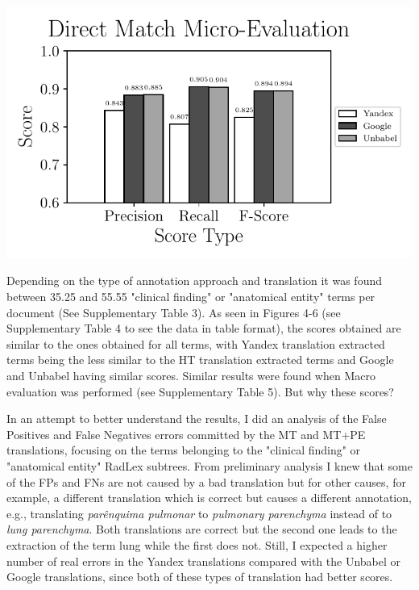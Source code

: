 \includegraphics{SupportFiles/plots/direct_match_micro_clinical_anatomical_subtrees_plot.pdf}

Depending on the type of annotation approach and translation it was found between 35.25 and 55.55 "clinical finding" or "anatomical entity" terms per document (See Supplementary Table 3). As seen in Figures 4-6 (see Supplementary Table 4 to see the data in table format), the scores obtained are similar to the ones obtained for all terms, with Yandex translation extracted terms being the less similar to the HT translation extracted terms and Google and Unbabel having similar scores. Similar results were found when Macro evaluation was performed (see Supplementary Table 5). But why these scores? 

In an attempt to better understand the results, I did an analysis of the False Positives and False Negatives errors committed by the MT and MT+PE translations, focusing on the terms belonging to the "clinical finding" or "anatomical entity" RadLex subtrees. From preliminary analysis I knew that some of the FPs and FNs are not caused by a bad translation but for other causes, for example, a different translation which is correct but causes a different annotation, e.g., translating \textit{parênquima pulmonar} to \textit{pulmonary parenchyma} instead of to \textit{lung parenchyma}. Both translations are correct but the second one leads to the extraction of the term lung while the first does not. Still, I expected a higher number of real errors in the Yandex translations compared with the Unbabel or Google translations, since both of these types of translation had better scores.

